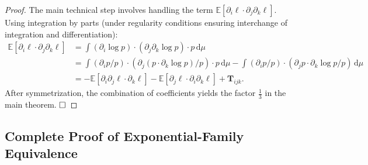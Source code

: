 \documentclass[12pt,a4paper]{article}
\theoremstyle{plain}
\theoremstyle{definition}
\theoremstyle{remark}
\newcommand{\E}{\mathbb{E}}
\newcommand{\dd}{\mathrm{d}}
\newcommand{\ACT}{\mathbf{T}}    %
\begin{document}
\begin{proof}
The main technical step involves handling the term $\E[\partial_i\ell \cdot \partial_j\partial_k\ell]$. Using integration by parts (under regularity conditions ensuring interchange of integration and differentiation):
\begin{align}
    \E[\partial_i\ell \cdot \partial_j\partial_k\ell]
    &= \int (\partial_i \log p) \cdot (\partial_j\partial_k \log p) \cdot p \, \dd\mu \nonumber\\
    &= \int (\partial_i p / p) \cdot (\partial_j(p \cdot \partial_k \log p) / p) \cdot p \, \dd\mu
       - \int (\partial_i p / p) \cdot (\partial_j p \cdot \partial_k \log p / p) \, \dd\mu \nonumber\\
    &= -\E[\partial_i\partial_j\ell \cdot \partial_k\ell] - \E[\partial_j\ell \cdot \partial_i\partial_k\ell] + \ACT_{ijk}.
\end{align}
After symmetrization, the combination of coefficients yields the factor $\frac{1}{3}$ in the main theorem. $\hfill\square$
\end{proof}

\subsection{Complete Proof of Exponential-Family Equivalence}
\end{document}
